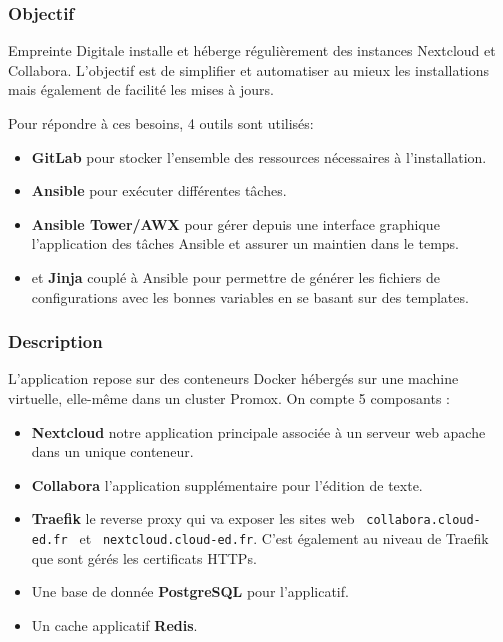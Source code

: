 \documentclass[12pt]{article}
\begin{document}
\subsubsection{Objectif}
Empreinte Digitale installe et héberge régulièrement des instances Nextcloud et Collabora. 
L'objectif est de simplifier et automatiser au mieux les installations mais également de facilité les mises à jours.

Pour répondre à ces besoins, 4 outils sont utilisés:
\begin{itemize}
    \item \textbf{GitLab} pour stocker l'ensemble des ressources nécessaires à l'installation.
    \item \textbf{Ansible} pour exécuter différentes tâches.
    \item \textbf{Ansible Tower/AWX} pour gérer depuis une interface graphique l'application des tâches Ansible et assurer un maintien dans le temps.
    \item et \textbf{Jinja} couplé à Ansible pour permettre de générer les fichiers de configurations avec les bonnes variables en se basant sur des templates.
\end{itemize}

\subsubsection{Description}
L'application repose sur des conteneurs Docker hébergés sur une machine virtuelle, elle-même dans un cluster Promox. On compte 5 composants :
\begin{itemize}
    \item \textbf{Nextcloud} notre application principale associée à un serveur web apache dans un unique conteneur.
    \item \textbf{Collabora} l'application supplémentaire pour l'édition de texte.
    \item \textbf{Traefik} le reverse proxy qui va exposer les sites web \verb| collabora.cloud-ed.fr | et  \verb| nextcloud.cloud-ed.fr|. 
    C'est également au niveau de Traefik que sont gérés les certificats HTTPs.
    \item Une base de donnée \textbf{PostgreSQL} pour l'applicatif.
    \item Un cache applicatif \textbf{Redis}.
\end{itemize}

\newpage
\end{document}
